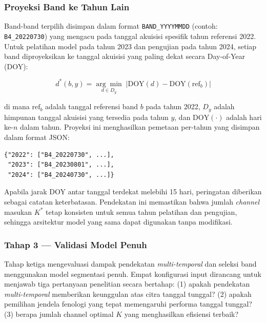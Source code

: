 \subsubsection{Proyeksi Band ke Tahun Lain}
\label{subsubsec:band_projection}

Band-band terpilih disimpan dalam format \texttt{BAND\_YYYYMMDD} (contoh: \texttt{B4\_20220730}) yang mengacu pada tanggal akuisisi spesifik tahun referensi 2022.
Untuk pelatihan model pada tahun 2023 dan pengujian pada tahun 2024, setiap band diproyeksikan ke tanggal akuisisi yang paling dekat secara Day-of-Year (DOY):

\begin{equation}
    d^*(b, y) = \underset{d \in D_y}{\arg\min}\; \left| \text{DOY}(d) - \text{DOY}(\text{ref}_b) \right|
\end{equation}

di mana $\text{ref}_b$ adalah tanggal referensi band $b$ pada tahun 2022, $D_y$ adalah himpunan tanggal akuisisi yang tersedia pada tahun $y$, dan $\text{DOY}(\cdot)$ adalah hari ke-$n$ dalam tahun.
Proyeksi ini menghasilkan pemetaan per-tahun yang disimpan dalam format JSON:
\begin{verbatim}
{"2022": ["B4_20220730", ...],
 "2023": ["B4_20230801", ...],
 "2024": ["B4_20240730", ...]}
\end{verbatim}

Apabila jarak DOY antar tanggal terdekat melebihi 15 hari, peringatan diberikan sebagai catatan keterbatasan.
Pendekatan ini memastikan bahwa jumlah \textit{channel} masukan $K^*$ tetap konsisten untuk semua tahun pelatihan dan pengujian, sehingga arsitektur model yang sama dapat digunakan tanpa modifikasi.

\subsubsection{Tahap 3 — Validasi Model Penuh}
\label{subsec:stage3_validation}

Tahap ketiga mengevaluasi dampak pendekatan \textit{multi-temporal} dan seleksi band menggunakan model segmentasi penuh.
Empat konfigurasi input dirancang untuk menjawab tiga pertanyaan penelitian secara bertahap:
(1) apakah pendekatan \textit{multi-temporal} memberikan keunggulan atas citra tanggal tunggal?
(2) apakah pemilihan jendela fenologi yang tepat memengaruhi performa tanggal tunggal?
(3) berapa jumlah channel optimal $K$ yang menghasilkan efisiensi terbaik?

